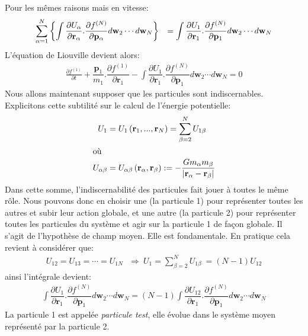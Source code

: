Pour les mêmes raisons mais en vitesse:
\begin{align*}%
	\begin{array}[c]{ll}%
		\displaystyle\sum\limits_{\alpha=1}^{N}\left\{  \displaystyle\int%
		\dfrac{\partial U_{\alpha}}{\partial\mathbf{r}_{\alpha}}.\dfrac{\partial
		f^{(N)}}{\partial\mathbf{p}_{\alpha}}d\mathbf{w}_{2}\cdots d\mathbf{w}%
		_{N}\right\}   & =\displaystyle\int\dfrac{\partial U_{1}}{\partial
		\mathbf{r}_{1}}.\dfrac{\partial f^{(N)}}{\partial\mathbf{p}_{1}}%
		d\mathbf{w}_{2}\cdots d\mathbf{w}_{N}%
	\end{array}
\end{align*}
L'équation de Liouville devient alors:
\begin{align*}
	\frac{\partial f^{(1)}}{\partial t}+\dfrac{\mathbf{p}_{1}}{m_{1}}.\dfrac{\partial f^{(1)}}{\partial\mathbf{r}_{1}}-\displaystyle\int%
	\dfrac{\partial U_{1}}{\partial\mathbf{r}_{1}}.\dfrac{\partial f^{(N)}}{\partial\mathbf{p}_{1}}d\mathbf{w}_{2}\cdots d\mathbf{w}_{N}=0
\end{align*}
Nous allons maintenant supposer que les particules sont indiscernables.
Explicitons cette subtilité sur le calcul de l'énergie potentielle:
\begin{align*}
	U_{1} &  =U_{1}\left(  \mathbf{r}_{1},...,\mathbf{r}_{N}\right)  =\sum_{\beta=2}^{N}U_{1\beta}\\
	\intertext{où}
	U_{\alpha\beta} &  =U_{\alpha\beta}\left(  \mathbf{r}_{\alpha},\mathbf{r}_{\beta}\right)  :=-\frac{Gm_{\alpha}m_{\beta}}{\left\vert\mathbf{r}_{\alpha}-\mathbf{r}_{\beta}\right\vert }%
\end{align*}
Dans cette somme, l'indiscernabilité des particules fait jouer à toutes le même rôle. Nous pouvons donc en choisir une (la particule 1) pour représenter
toutes les autres et subir leur action globale, et une autre (la particule 2) pour représenter toutes les particules du système et agir sur la
particule 1 de façon globale. Il s'agit de l'hypothèse de champ moyen. Elle est fondamentale. En pratique cela revient à considérer que:
\begin{align*}
	U_{12}=U_{13}=\cdots=U_{1N}\ \ \ \Rightarrow\ U_{1}=\sum_{\beta=2}^{N}U_{1\beta}\ =\left(  N-1\right)  U_{12}
\end{align*}
ainsi l'intégrale devient:
\begin{align*}
	\displaystyle\int\dfrac{\partial U_{1}}{\partial\mathbf{r}_{1}}.\dfrac{\partial f^{(N)}}{\partial\mathbf{p}_{1}}d\mathbf{w}_{2}\cdots d\mathbf{w}%
	_{N}=\left(  N-1\right)  \displaystyle\int\dfrac{\partial U_{12}}{\partial\mathbf{r}_{1}}.\dfrac{\partial f^{(N)}}{\partial\mathbf{p}_{1}%
	}d\mathbf{w}_{2}\cdots d\mathbf{w}_{N}%
\end{align*}
La particule 1 est appelée \og\emph{particule test}\fg, elle évolue dans le système moyen représenté par la particule 2.

